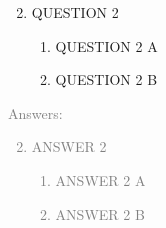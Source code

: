 \documentclass[11pt]{article}
\begin{document}
\begin{enumerate}
	\setcounter{enumi}{1}
	\item QUESTION 2
	\begin{enumerate}
		\item QUESTION  2 A
		\item QUESTION  2 B  
	\end{enumerate}
\end{enumerate}
\textcolor{gray}{
Answers:
\begin{enumerate}
	\setcounter{enumi}{1}
	\item ANSWER  2 
	\begin{enumerate}
		\item ANSWER  2 A
		\item ANSWER  2 B  
	\end{enumerate}
\end{enumerate}
}
\end{document}
